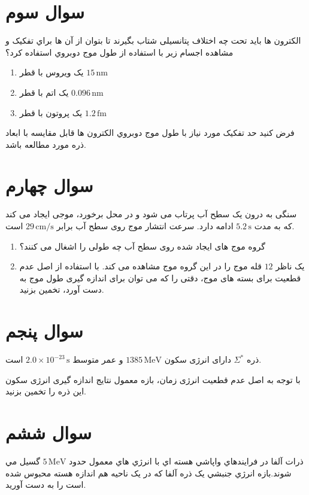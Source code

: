 \documentclass[a4paper,12pt]{article}
\begin{document}
	\section{سوال سوم}
	
	الکترون ها بايد تحت چه اختلاف پتانسيلی شتاب بگيرند تا بتوان از آن ها براي تفکيک و مشاهده اجسام زير با استفاده از طول موج دوبروي استفاده کرد؟
	
	\begin{enumerate}
		\item[(الف)] يک ويروس با قطر \(15\,\mathrm{nm}\)
		\item[(ب)] يک اتم با قطر \(0.096\,\mathrm{nm}\)
		\item[(ج)] يک پروتون با قطر \(1.2\,\mathrm{fm}\)
	\end{enumerate}
	
	فرض کنيد حد تفکيک مورد نياز با طول موج دوبروي الکترون ها قابل مقايسه با ابعاد ذره مورد مطالعه باشد.
\section{سوال چهارم}

سنگی به درون يک سطح آب پرتاب می شود و در محل برخورد، موجی ايجاد می کند که به مدت \(5.2\,\mathrm{s}\) ادامه دارد. سرعت انتشار موج روی سطح آب برابر \(29\,\mathrm{cm/s}\) است.

\begin{enumerate}
	\item[(الف)] گروه موج های ايجاد شده روی سطح آب چه طولی را اشغال می کنند؟
	
	\item[(ب)] يک ناظر \(12\) قله موج را در اين گروه موج مشاهده می کند. با استفاده از اصل عدم قطعيت برای بسته های موج، دقتی را که می توان برای اندازه گيری طول موج به دست آورد، تخمين بزنيد.
\end{enumerate}
	\section{سوال پنجم}
	
	ذره \(\Sigma^*\) دارای انرژی سکون \(1385\,\mathrm{MeV}\) و عمر متوسط \(2.0 \times 10^{-23}\,\mathrm{s}\) است.
	
	با توجه به اصل عدم قطعیت انرژی زمان، بازه معمول نتایج اندازه گیری انرژی سکون این ذره را تخمین بزنید.
	\section{سوال ششم}
	
	ذرات آلفا در فرایندهاي واپاشي هسته اي با انرژي هاي معمول حدود \(5\,\mathrm{MeV}\) گسيل مي شوند.بازه انرژي جنبشي يک ذره آلفا که در يک ناحيه هم اندازه هسته محبوس شده است را به دست آوريد.
	
\end{document}
